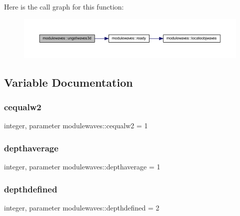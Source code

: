 Here is the call graph for this function\+:\nopagebreak
\begin{figure}[H]
\begin{center}
\leavevmode
\includegraphics[width=350pt]{namespacemodulewaves_a889d8243c00922f75bfc878e13f4990d_cgraph}
\end{center}
\end{figure}


\subsection{Variable Documentation}
\mbox{\label{namespacemodulewaves_afc5fc3687c43abb90ea8cc2924589fce}} 
\subsubsection{\texorpdfstring{cequalw2}{cequalw2}}
{\footnotesize\ttfamily integer, parameter modulewaves\+::cequalw2 = 1\hspace{0.3cm}{\ttfamily [private]}}

\mbox{\label{namespacemodulewaves_aa5509403ebbe9faf3f9a266a1e8786e5}} 
\subsubsection{\texorpdfstring{depthaverage}{depthaverage}}
{\footnotesize\ttfamily integer, parameter modulewaves\+::depthaverage = 1\hspace{0.3cm}{\ttfamily [private]}}

\mbox{\label{namespacemodulewaves_a06e058d903999d0b1ea133a633d3ba26}} 
\subsubsection{\texorpdfstring{depthdefined}{depthdefined}}
{\footnotesize\ttfamily integer, parameter modulewaves\+::depthdefined = 2\hspace{0.3cm}{\ttfamily [private]}}

